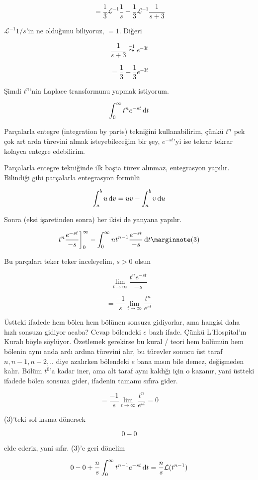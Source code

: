 \documentclass[12pt,fleqn]{article}\usepackage{../../common}
\begin{document}
$$ = \frac{1}{3} \mathcal{L}^{-1}\frac{1}{s}  - 
\frac{1}{3} \mathcal{L}^{-1}\frac{1}{s+3}  
$$

$\mathcal{L}^{-1}1/s$'in ne olduğunu biliyoruz, $=1$. Diğeri

$$ \frac{1}{s+3} \stackrel{-1}{\leadsto} e^{-3t} $$

$$ =  
\frac{1}{3} - \frac{1}{3} e^{-3t}
$$

Şimdi $t^n$'nin Laplace transformunu yapmak istiyorum. 

$$ \int_0^{\infty} t^ne^{-st} \,\mathrm{d} t $$

Parçalarla entegre (integration by parts) tekniğini kullanabilirim, çünkü
$t^n$ pek çok art arda türevini almak isteyebileceğim bir şey, $e^{-st}$'yi
ise tekrar tekrar kolayca entegre edebilirim. 

Parçalarla entegre tekniğinde ilk başta türev alınmaz, entegrasyon
yapılır. Bilindiği gibi parçalarla entegrasyon formülü

$$ \int_a^b u \,\mathrm{d} v =  uv - \int_a^b v \,\mathrm{d} u  $$

Sonra (eksi işaretinden sonra) her ikisi de yanyana yapılır. 

$$
t^n \frac{e^{-st}}{-s} \bigg]_{0}^{\infty}  - 
\int_{0}^{\infty} nt^{n-1} \frac{e^{-st}}{-s} \ud t
\mlabel{3}
$$ 

Bu parçaları teker teker inceleyelim, $s>0$ olsun

$$ \lim_{t \to \infty} \frac{t^n  e^{-st}}{-s}$$ 

$$ = \frac{-1}{s}\lim_{t \to \infty} \frac{t^n}{ e^{st}}$$ 

Üstteki ifadede hem bölen hem bölünen sonsuza gidiyorlar, ama hangisi daha
hızlı sonsuza gidiyor acaba? Cevap bölendeki $e$ bazlı ifade. Çünkü
L'Hospital'ın Kuralı böyle söylüyor. Özetlemek gerekirse bu kural / teori
hem bölümün hem bölenin aynı anda ardı ardına türevini alır, bu türevler
sonucu üst taraf $n,n-1,n-2,..$ diye azalırken bölendeki $e$ bana mısın
bile demez, değişmeden kalır. Bölüm $t^0$'a kadar iner, ama alt taraf aynı
kaldığı için o kazanır, yani üstteki ifadede bölen sonsuza gider, ifadenin
tamamı sıfıra gider. 

$$ = \frac{-1}{s}\lim_{t \to \infty} \frac{t^n}{ e^{st}} = 0$$ 

(3)'teki sol kısma dönersek 

$$ 0 - 0  $$

elde ederiz, yani sıfır. (3)'e geri dönelim

$$
0 - 0   +
\frac{n}{s} \int_{0}^{\infty} t^{n-1} e^{-st} \,\mathrm{d} t = 
\frac{n}{s} \mathcal{L} (t^{n-1})
$$
\end{document}
